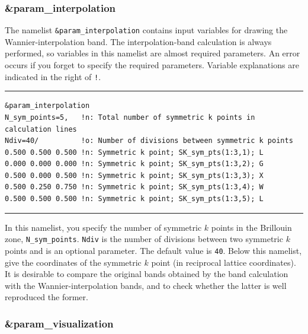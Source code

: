 \documentclass{article}
\begin{document}
\subsubsection{\&param\_interpolation}  
The namelist \verb+&param_interpolation+ contains input variables for drawing the Wannier-interpolation band. The interpolation-band calculation is always performed, so variables in this namelist are almost required parameters. An error occurs if you forget to specify the required parameters. Variable explanations are indicated in the right of \verb+!+. 
\vspace{3mm}\hrule
\begin{verbatim}
&param_interpolation   
N_sym_points=5,   !n: Total number of symmetric k points in calculation lines
Ndiv=40/          !o: Number of divisions between symmetric k points
0.500 0.500 0.500 !n: Symmetric k point; SK_sym_pts(1:3,1); L
0.000 0.000 0.000 !n: Symmetric k point; SK_sym_pts(1:3,2); G
0.500 0.000 0.500 !n: Symmetric k point; SK_sym_pts(1:3,3); X
0.500 0.250 0.750 !n: Symmetric k point; SK_sym_pts(1:3,4); W
0.500 0.500 0.500 !n: Symmetric k point; SK_sym_pts(1:3,5); L 
\end{verbatim}
\hrule\vspace{3mm}
In this namelist, you specify the number of symmetric $k$ points in the Brillouin zone, \verb+N_sym_points+. \verb+Ndiv+ is the number of divisions between two symmetric $k$ points and is an optional parameter. The default value is \verb+40+. Below this namelist, give the coordinates of the symmetric $k$ point (in reciprocal lattice coordinates). It is desirable to compare the original bands obtained by the band calculation with the Wannier-interpolation bands, and to check whether the latter is well reproduced the former.

\subsubsection{\&param\_visualization} 
\end{document}
